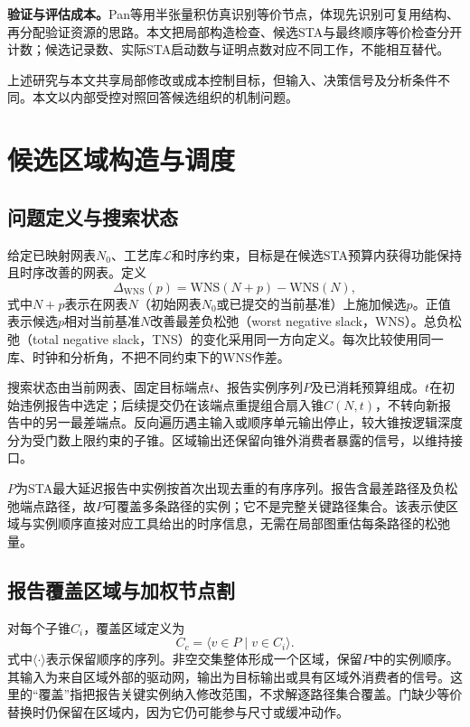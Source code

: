 \documentclass[twocolumn,10pt,fontset=windows]{ctexart}
\begin{document}
\textbf{验证与评估成本。}Pan等\cite{zhong2024stp}用半张量积仿真识别等价节点，体现先识别可复用结构、再分配验证资源的思路。本文把局部构造检查、候选STA与最终顺序等价检查分开计数；候选记录数、实际STA启动数与证明点数对应不同工作，不能相互替代。

上述研究与本文共享局部修改或成本控制目标，但输入、决策信号及分析条件不同。本文以内部受控对照回答候选组织的机制问题。

\section{候选区域构造与调度}

\subsection{问题定义与搜索状态}

给定已映射网表$N_0$、工艺库$\mathcal L$和时序约束，目标是在候选STA预算内获得功能保持且时序改善的网表。定义
\begin{equation}\label{eq:gain}
\Delta_{\mathrm{WNS}}(p)=\mathrm{WNS}(N+p)-\mathrm{WNS}(N),
\end{equation}
式中$N{+}p$表示在网表$N$（初始网表$N_0$或已提交的当前基准）上施加候选$p$。正值表示候选$p$相对当前基准$N$改善最差负松弛（worst negative slack，WNS）。总负松弛（total negative slack，TNS）的变化采用同一方向定义。每次比较使用同一库、时钟和分析角，不把不同约束下的WNS作差。

搜索状态由当前网表、固定目标端点$t$、报告实例序列$P$及已消耗预算组成。$t$在初始违例报告中选定；后续提交仍在该端点重提组合扇入锥$C(N,t)$，不转向新报告中的另一最差端点。反向遍历遇主输入或顺序单元输出停止，较大锥按逻辑深度分为受门数上限约束的子锥。区域输出还保留向锥外消费者暴露的信号，以维持接口。

$P$为STA最大延迟报告中实例按首次出现去重的有序序列。报告含最差路径及负松弛端点路径，故$P$可覆盖多条路径的实例；它不是完整关键路径集合。该表示使区域与实例顺序直接对应工具给出的时序信息，无需在局部图重估每条路径的松弛量。

\subsection{报告覆盖区域与加权节点割}\label{sec:regions}

对每个子锥$C_i$，覆盖区域定义为
\begin{equation}\label{eq:cover_region}
C_c=\langle v\in P\mid v\in C_i\rangle.
\end{equation}
式中$\langle\cdot\rangle$表示保留顺序的序列。非空交集整体形成一个区域，保留$P$中的实例顺序。其输入为来自区域外部的驱动网，输出为目标输出或具有区域外消费者的信号。这里的“覆盖”指把报告关键实例纳入修改范围，不求解逐路径集合覆盖。门缺少等价替换时仍保留在区域内，因为它仍可能参与尺寸或缓冲动作。
\end{document}
